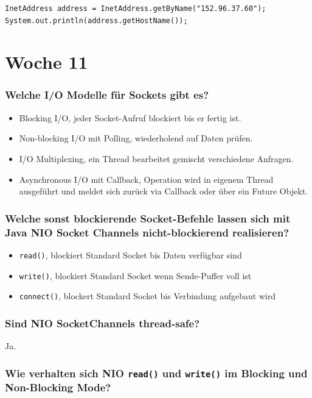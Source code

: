 \documentclass[10pt,a4paper]{scrartcl}
\begin{document}
\begin{verbatim}
InetAddress address = InetAddress.getByName("152.96.37.60");
System.out.println(address.getHostName());
\end{verbatim}


\section{Woche 11}

\subsubsection{Welche I/O Modelle für Sockets gibt es?}

\begin{itemize}
	\item Blocking I/O, jeder Socket-Aufruf blockiert bis er fertig ist.
	\item Non-blocking I/O mit Polling, wiederholend auf Daten prüfen.
	\item I/O Multiplexing, ein Thread bearbeitet gemischt verschiedene Anfragen.
	\item Asynchronous I/O mit Callback, Operation wird in eigenem Thread ausgeführt und meldet sich
		zurück via Callback oder über ein Future Objekt.
\end{itemize}

\subsubsection{Welche sonst blockierende Socket-Befehle lassen sich mit Java NIO Socket Channels
nicht-blockierend realisieren?}

\begin{itemize}
	\item \texttt{read()}, blockiert Standard Socket bis Daten verfügbar sind
	\item \texttt{write()}, blockiert Standard Socket wenn Sende-Puffer voll ist
	\item \texttt{connect()}, blockert Standard Socket bis Verbindung aufgebaut wird
\end{itemize}

\subsubsection{Sind NIO SocketChannels thread-safe?}

Ja.
  
\subsubsection{Wie verhalten sich NIO \texttt{read()} und \texttt{write()} im Blocking und
Non-Blocking Mode?}
\end{document}

